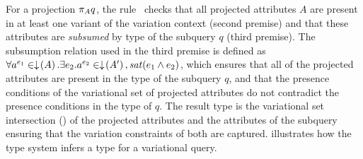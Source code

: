 % 
For a projection $\vPrj[A]{q}$, the rule \prjE\ checks that all projected
attributes $A$ are present in at least one variant of the variation context
(second premise) and that these attributes are \emph{subsumed} by type of the
subquery $q$ (third premise).
%
The subsumption relation  used in the third premise is defined
as
%
$\forall \annot[e_1]{a} \in \pushIn{A}.
 \exists e_2.
 \annot[e_2]{a}\in\pushIn{A'}, \sat{e_1 \wedge e_2}$,
%
which ensures that all of the projected attributes are present in the type of
the subquery $q$, and that the presence conditions of the variational set of projected
attributes do not contradict the presence conditions in the type of $q$.
%
The result type is the variational set intersection () of the
projected attributes and the attributes of the subquery ensuring that the
variation constraints of both are captured.
%
 illustrates how the type system infers a type for a variational query.


